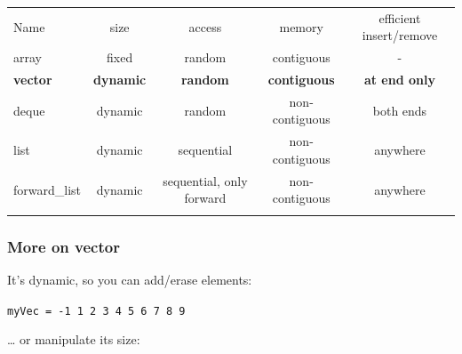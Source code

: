 \begin{longtable}[c]{@{}lcccc@{}}
\toprule\addlinespace
Name & size & access & memory & efficient insert/remove
\\\addlinespace
\midrule\endhead
array & fixed & random & contiguous & -
\\\addlinespace
\textbf{vector} & \textbf{dynamic} & \textbf{random} &
\textbf{contiguous} & \textbf{at end only}
\\\addlinespace
deque & dynamic & random & non-contiguous & both ends
\\\addlinespace
list & dynamic & sequential & non-contiguous & anywhere
\\\addlinespace
forward\_list & dynamic & sequential, only forward & non-contiguous &
anywhere
\\\addlinespace
\bottomrule
\end{longtable}

\subsubsection{More on vector}\label{more-on-vector}

It's dynamic, so you can add/erase elements:

\begin{Shaded}
\begin{Highlighting}[]
 \NormalTok{(} 
\NormalTok{\}}
\NormalTok{);}
\NormalTok{);}
\end{Highlighting}
\end{Shaded}

\texttt{myVec = -1 1 2 3 4 5 6 7 8 9}

\ldots{} or manipulate its size:

\begin{Shaded}
\begin{Highlighting}[]
\NormalTok{);}
 
\NormalTok{);}
 \NormalTok{;}
\end{Highlighting}
\end{Shaded}

